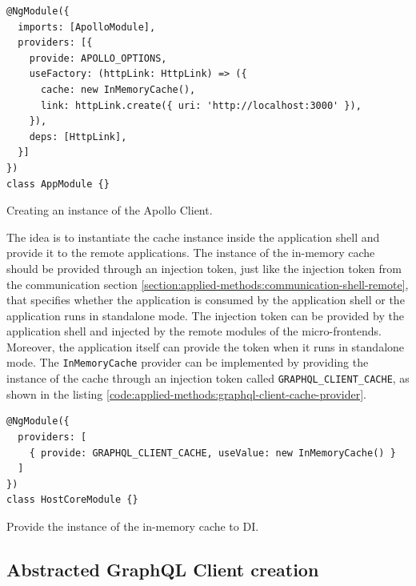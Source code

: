 \ifshowListings
\begin{listing}[H]
\begin{verbatim}
@NgModule({
  imports: [ApolloModule],
  providers: [{
    provide: APOLLO_OPTIONS,
    useFactory: (httpLink: HttpLink) => ({
      cache: new InMemoryCache(),
      link: httpLink.create({ uri: 'http://localhost:3000' }),
    }),
    deps: [HttpLink],
  }]
})
class AppModule {}
\end{verbatim}
\caption{Creating an instance of the Apollo Client.}\label{code:applied-methods:creating-the-apollo-client}
\end{listing}
\fi

\noindent The idea is to instantiate the cache instance inside the application shell and provide it to the remote applications. The instance of the in-memory cache should be provided through an injection token, just like the injection token from the communication section \ref{section:applied-methods:communication-shell-remote}, that specifies whether the application is consumed by the application shell or the application runs in standalone mode. The injection token can be provided by the application shell and injected by the remote modules of the micro-frontends. Moreover, the application itself can provide the token when it runs in standalone mode. The \texttt{InMemoryCache} provider can be implemented by providing the instance of the cache through an injection token called \texttt{GRAPHQL\_CLIENT\_CACHE}, as shown in the listing \ref{code:applied-methods:graphql-client-cache-provider}.

\ifshowListings
\begin{listing}[H]
\begin{verbatim}
@NgModule({
  providers: [
    { provide: GRAPHQL_CLIENT_CACHE, useValue: new InMemoryCache() }
  ]
})
class HostCoreModule {}
\end{verbatim}
\caption{Provide the instance of the in-memory cache to \ac{DI}.}\label{code:applied-methods:graphql-client-cache-provider}
\end{listing}
\fi

\subsection{Abstracted GraphQL Client creation}

